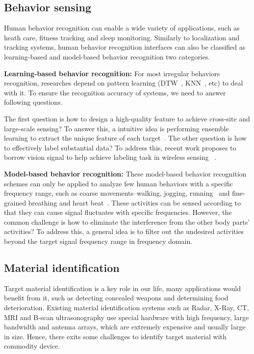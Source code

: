 \subsection{Behavior sensing} Human behavior recognition can enable a wide variety of applications, such as heath care, fitness tracking
and sleep monitoring. Similarly to localization and tracking systems, human behavior recognition interfaces can also be classified as
learning-based and model-based behavior recognition two categories.

\textbf{Learning-based behavior recognition:} For most irregular behaviors recognition, researches depend on pattern learning (DTW~\cite{Wang2014We}, KNN~\cite{Forster2011Incremental}, etc) to deal with it. To ensure the recognition accuracy of systems, we need to answer following questions.

The first question is how to design a high-quality feature to achieve cross-site and large-scale sensing? To answer this, a intuitive idea is performing ensemble learning to extract the unique feature of each target~\cite{CrossSense}. The other question is how to effectively label substantial data? To address this, recent work proposes to borrow vision signal to help achieve labeling task in wireless sensing ~\cite{zhao2018rf}.

\textbf{Model-based behavior recognition:} These model-based behavior recognition schemes can only be applied to analyze few human behaviors with a specific frequency range, such as coarse movements--walking, jogging, running~\cite{Wang2015Understanding} and fine-grained breathing and heart beat~\cite{Smart-homes}. These activities can be sensed according to that they can cause signal fluctuates with specific frequencies. However, the common challenge is how to eliminate the interference from the other body parts' activities? To address this, a general idea is to filter out the undesired activities beyond the target signal frequency range in frequency domain.

\subsection{Material identification} Target material identification is a key role in our life, many applications would benefit from it, such as detecting concealed weapons and determining food deterioration. Existing material identification systems such as Radar, X-Ray, CT, MRI and B-scan ultrasonography use special hardware with high frequency, large bandwidth and antenna arrays, which are extremely expensive and usually large in size. Hence, there exits some challenges to identify target material with commodity device.

